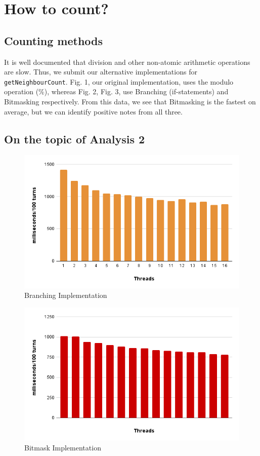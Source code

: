 \documentclass[twoside,twocolumn]{article}
\begin{document}
\section{How to count?}
\subsection{Counting methods}
It is well documented that division and other non-atomic arithmetic operations are slow. Thus, we submit our alternative
implementations for \texttt{getNeighbourCount}. Fig. 1, our original implementation, uses the modulo operation (\%), 
whereas Fig. 2, Fig. 3, use Branching (if-statements) and Bitmasking respectively. From this data, we see
that Bitmasking is the fastest on average, but we can identify positive notes from all three.
\subsection{On the topic of Analysis 2}
\begin{figure}
  \includegraphics[width=\linewidth]{branching.png}
  \caption{Branching Implementation}
  \label{fig:chart2}
\end{figure}
\begin{figure}
  \includegraphics[width=\linewidth]{bitmask.png}
  \caption{Bitmask Implementation}
  \label{fig:chart3}
\end{figure}
\end{document}

